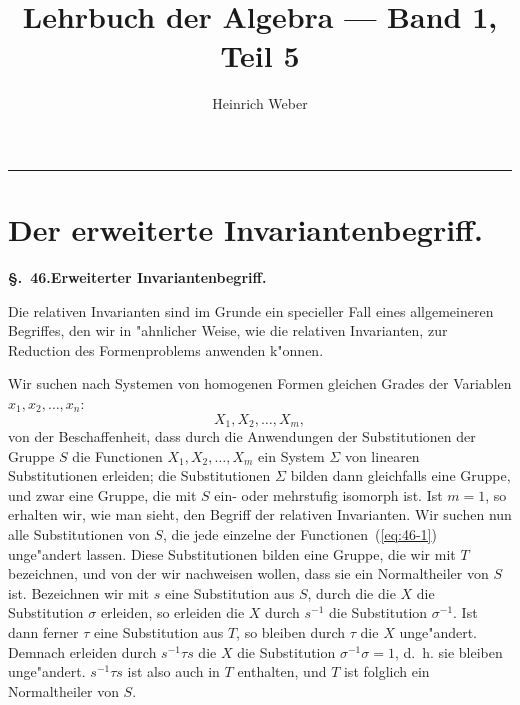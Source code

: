 \documentclass[12pt,a4paper]{article}
\title{\textbf{Lehrbuch der Algebra --- Band 1, Teil 5}}
\author{Heinrich Weber}
\date{}
\theoremstyle{definition}
\begin{document}
\maketitle
\thispagestyle{empty}

\vspace{1cm}
\noindent\rule{\textwidth}{0.4pt}
\vspace{0.5cm}

\tableofcontents
\newpage


\section{Der erweiterte Invariantenbegriff.}\label{sec:46}

\noindent\textbf{\S.~46.}\quad\textbf{Erweiterter Invariantenbegriff.}
\vspace{0.3cm}

Die relativen Invarianten sind im Grunde ein specieller Fall eines allgemeineren Begriffes, den wir in "ahnlicher Weise, wie die relativen Invarianten, zur Reduction des Formenproblems anwenden k"onnen.

Wir suchen nach Systemen von homogenen Formen gleichen Grades der Variablen $x_1, x_2, \ldots, x_n$:
\begin{equation}\label{eq:46-1}
X_1, X_2, \ldots, X_m,
\end{equation}
von der Beschaffenheit, dass durch die Anwendungen der Substitutionen der Gruppe $S$ die Functionen $X_1, X_2, \ldots, X_m$ ein System $\Sigma$ von linearen Substitutionen erleiden; die Substitutionen $\Sigma$ bilden dann gleichfalls eine Gruppe, und zwar eine Gruppe, die mit $S$ ein- oder mehrstufig isomorph ist. Ist $m = 1$, so erhalten wir, wie man sieht, den Begriff der relativen Invarianten. Wir suchen nun alle Substitutionen von $S$, die jede einzelne der Functionen~(\ref{eq:46-1}) unge"andert lassen. Diese Substitutionen bilden eine Gruppe, die wir mit $T$ bezeichnen, und von der wir nachweisen wollen, dass sie ein Normaltheiler von $S$ ist. Bezeichnen wir mit $s$ eine Substitution aus $S$, durch die die $X$ die Substitution $\sigma$ erleiden, so erleiden die $X$ durch $s^{-1}$ die Substitution $\sigma^{-1}$. Ist dann ferner $\tau$ eine Substitution aus $T$, so bleiben durch $\tau$ die $X$ unge"andert. Demnach erleiden durch $s^{-1}\tau s$ die $X$ die Substitution $\sigma^{-1}\sigma = 1$, d.~h. sie bleiben unge"andert. $s^{-1}\tau s$ ist also auch in $T$ enthalten, und $T$ ist folglich ein Normaltheiler von $S$.
\end{document}
